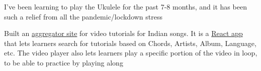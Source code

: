 \begin{cventries}
      {} %
      {
        \begin{cvitems} %
        \item {I've been learning to play the Ukulele for the past 7-8 months, and it has been such a relief from all the pandemic/lockdown stress}
        \item {Built an \href{https://ukulele.muse-amuse.in/}{aggregator site} for video tutorials for Indian songs. It is a \href{https://github.com/punchagan/ukulele-tutorials/}{React app} that lets learners search for tutorials based on Chords, Artists, Album, Language, etc. The video player also lets learners play a specific portion of the video in loop, to be able to practice by playing along}
        \end{cvitems}
      }
\end{cventries}
